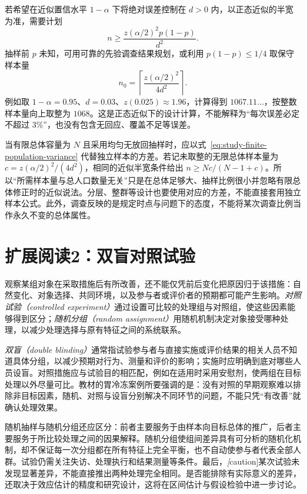 若希望在近似置信水平 $1-\alpha$ 下将绝对误差控制在 $d>0$ 内，以正态近似的半宽为准，需要计划
\begin{equation}
  n\ge\frac{z(\alpha/2)^2p(1-p)}{d^2}.
  \label{eq:study-poll-sample-size}
\end{equation}
抽样前 $p$ 未知，可用可靠的先验调查结果规划，或利用 $p(1-p)\le1/4$ 取保守样本量
\[
  n_0=\left\lceil\frac{z(\alpha/2)^2}{4d^2}\right\rceil.
\]
例如取 $1-\alpha=0.95$、$d=0.03$、$z(0.025)\approx1.96$，计算得到 $1067.11\ldots$，按整数样本量向上取整为 $1068$。这是正态近似下的设计计算，不能解释为“每次误差必定不超过 $3\%$”，也没有包含无回应、覆盖不足等误差。

当有限总体容量为 $N$ 且采用均匀无放回抽样时，应以式~\eqref{eq:study-finite-population-variance} 代替独立样本的方差。若记未取整的无限总体样本量为 $c=z(\alpha/2)^2/(4d^2)$，相同的近似半宽条件给出 $n\ge Nc/(N-1+c)$。所以“所需样本量与总人口数量无关”只是在总体足够大、抽样比例很小并忽略有限总体修正时的近似说法。分层、整群等设计也要使用对应的方差，不能直接套用独立样本公式。此外，调查反映的是规定时点与问题下的态度，不能将某次调查比例当作永久不变的总体属性。

\section{扩展阅读2：双盲对照试验}
\label{sec:study-double-blind-trials}

观察某组对象在采取措施后有所改善，还不能仅凭前后变化把原因归于该措施：自然变化、对象选择、共同环境，以及参与者或评价者的预期都可能产生影响。\emph{对照试验（controlled experiment）}通过设置可比较的处理组与对照组，使这些因素能够得到区分；\emph{随机分组（random assignment）}用随机机制决定对象接受哪种处理，以减少处理选择与原有特征之间的系统联系。

\emph{双盲（double blinding）}通常指试验参与者与直接实施或评价结果的相关人员不知道具体分组，以减少预期对行为、测量和评价的影响；实施时应明确到底对哪些人员设盲。对照措施应与试验目的相匹配，例如在适用时采用安慰剂，使两组在目标处理以外尽量可比。教材的胃冷冻案例所要强调的是：没有对照的早期观察难以排除非目标因素，随机、对照与设盲分别解决不同环节的问题，不能只凭“有改善”就确认处理效果。

随机抽样与随机分组还应区分：前者主要服务于由样本向目标总体的推广，后者主要服务于所比较处理之间的因果解释。随机分组使组间差异具有可分析的随机化机制，却不保证每一次分组都在所有特征上完全平衡，也不自动使参与者代表全部人群。试验仍需关注失访、处理执行和结果测量等条件。最后，\emph[caution]{某次试验未发现显著差异，不能直接推出两种处理完全相同。}是否能排除有实际意义的差异，还取决于效应估计的精度和研究设计，这将在区间估计与假设检验中进一步讨论。

